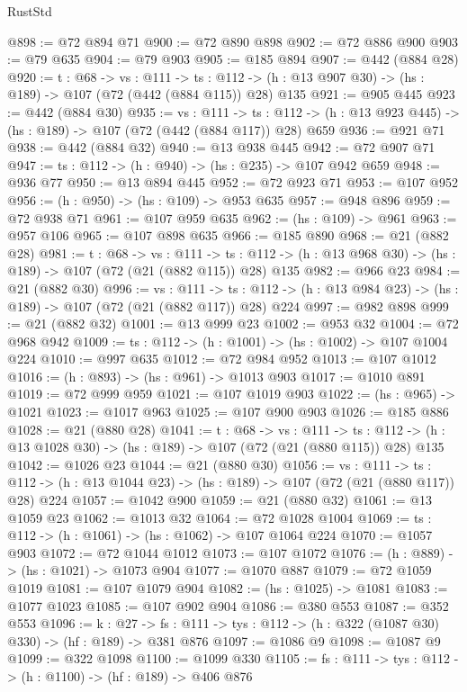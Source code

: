\begin{lexlean}{RustStd}
\begin{coremodule}
@898 := @72 @894 @71
@900 := @72 @890 @898
@902 := @72 @886 @900
@903 := @79 @635
@904 := @79 @903
@905 := @185 @894
@907 := @442 (@884 @28)
@920 := {t : @68} ->
  {vs : @111} ->
  {ts : @112} -> (h : @13 @907 @30) -> (hs : @189) -> @107 (@72 (@442 (@884 @115)) @28) @135
@921 := @905 @445
@923 := @442 (@884 @30)
@935 := {vs : @111} ->
  {ts : @112} -> (h : @13 @923 @445) -> (hs : @189) -> @107 (@72 (@442 (@884 @117)) @28) @659
@936 := @921 @71
@938 := @442 (@884 @32)
@940 := @13 @938 @445
@942 := @72 @907 @71
@947 := {ts : @112} -> (h : @940) -> (hs : @235) -> @107 @942 @659
@948 := @936 @77
@950 := @13 @894 @445
@952 := @72 @923 @71
@953 := @107 @952
@956 := (h : @950) -> (hs : @109) -> @953 @635
@957 := @948 @896
@959 := @72 @938 @71
@961 := @107 @959 @635
@962 := (hs : @109) -> @961
@963 := @957 @106
@965 := @107 @898 @635
@966 := @185 @890
@968 := @21 (@882 @28)
@981 := {t : @68} ->
  {vs : @111} ->
  {ts : @112} -> (h : @13 @968 @30) -> (hs : @189) -> @107 (@72 (@21 (@882 @115)) @28) @135
@982 := @966 @23
@984 := @21 (@882 @30)
@996 := {vs : @111} ->
  {ts : @112} -> (h : @13 @984 @23) -> (hs : @189) -> @107 (@72 (@21 (@882 @117)) @28) @224
@997 := @982 @898
@999 := @21 (@882 @32)
@1001 := @13 @999 @23
@1002 := @953 @32
@1004 := @72 @968 @942
@1009 := {ts : @112} -> (h : @1001) -> (hs : @1002) -> @107 @1004 @224
@1010 := @997 @635
@1012 := @72 @984 @952
@1013 := @107 @1012
@1016 := (h : @893) -> (hs : @961) -> @1013 @903
@1017 := @1010 @891
@1019 := @72 @999 @959
@1021 := @107 @1019 @903
@1022 := (hs : @965) -> @1021
@1023 := @1017 @963
@1025 := @107 @900 @903
@1026 := @185 @886
@1028 := @21 (@880 @28)
@1041 := {t : @68} ->
  {vs : @111} ->
  {ts : @112} -> (h : @13 @1028 @30) -> (hs : @189) -> @107 (@72 (@21 (@880 @115)) @28) @135
@1042 := @1026 @23
@1044 := @21 (@880 @30)
@1056 := {vs : @111} ->
  {ts : @112} -> (h : @13 @1044 @23) -> (hs : @189) -> @107 (@72 (@21 (@880 @117)) @28) @224
@1057 := @1042 @900
@1059 := @21 (@880 @32)
@1061 := @13 @1059 @23
@1062 := @1013 @32
@1064 := @72 @1028 @1004
@1069 := {ts : @112} -> (h : @1061) -> (hs : @1062) -> @107 @1064 @224
@1070 := @1057 @903
@1072 := @72 @1044 @1012
@1073 := @107 @1072
@1076 := (h : @889) -> (hs : @1021) -> @1073 @904
@1077 := @1070 @887
@1079 := @72 @1059 @1019
@1081 := @107 @1079 @904
@1082 := (hs : @1025) -> @1081
@1083 := @1077 @1023
@1085 := @107 @902 @904
@1086 := @380 @553
@1087 := @352 @553
@1096 := {k : @27} ->
  {fs : @111} -> {tys : @112} -> (h : @322 (@1087 @30) @330) -> (hf : @189) -> @381 @876
@1097 := @1086 @9
@1098 := @1087 @9
@1099 := @322 @1098
@1100 := @1099 @330
@1105 := {fs : @111} -> {tys : @112} -> (h : @1100) -> (hf : @189) -> @406 @876

\end{coremodule}
\end{lexlean}
